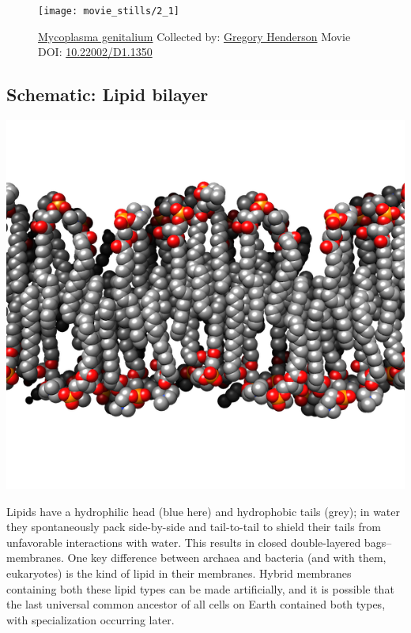 \documentclass[]{tufte-book}
\begin{document}
\begin{figure}
\texttt{[image: movie\_stills/2\_1]} \caption[\protect\hyperlink{tree}{Mycoplasma genitalium} Collected by:
\protect\hyperlink{gregory_henderson}{Gregory Henderson} Movie DOI:
\href{https://doi.org/10.22002/D1.1350}{10.22002/D1.1350}]{\protect\hyperlink{tree}{Mycoplasma genitalium} Collected by:
\protect\hyperlink{gregory_henderson}{Gregory Henderson} Movie DOI:
\href{https://doi.org/10.22002/D1.1350}{10.22002/D1.1350}}\label{fig:2-1}
\end{figure}

\hypertarget{Lipid_bilayer}{\subsection*{Schematic: Lipid
bilayer}\label{Lipid_bilayer}}

\includegraphics{img/schematics/2_1_1}

Lipids have a hydrophilic head (blue here) and hydrophobic tails (grey);
in water they spontaneously pack side-by-side and tail-to-tail to shield
their tails from unfavorable interactions with water. This results in
closed double-layered bags--membranes. One key difference between
archaea and bacteria (and with them, eukaryotes) is the kind of lipid in
their membranes. Hybrid membranes containing both these lipid types can
be made artificially, and it is possible that the last universal common
ancestor of all cells on Earth contained both types, with specialization
occurring later.
\end{document}
